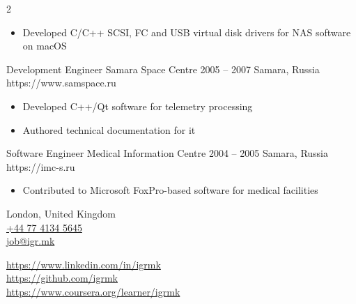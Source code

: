 \documentclass[9pt,a4paper]{igrmkcv}
\begin{document}
\begin{paracol}{2}
        \begin{itemize}
            \item Developed C/C++ SCSI, FC and USB virtual disk drivers for NAS software on macOS
        \end{itemize}

    \cvLeftEvent
        {Development Engineer}
        {Samara Space Centre}
        {2005 -- 2007}
        {Samara, Russia}
        {https://www.samspace.ru}

        \begin{itemize}
            \item Developed C++/Qt software for telemetry processing
            \item Authored technical documentation for it
        \end{itemize}

    \cvLeftEvent
        {Software Engineer}
        {Medical Information Centre}
        {2004 -- 2005}
        {Samara, Russia}
        {https://imc-s.ru}

        \begin{itemize}
            \item Contributed to Microsoft FoxPro-based software for medical facilities
        \end{itemize}

\newpage
\switchcolumn

    London, United Kingdom\\
    \href{tel:+447741345645}{+44 77 4134 5645}\\
    \href{mailto:job@igr.mk}{job@igr.mk}

    \vspace{6pt}
    {
        \small
        \href{https://www.linkedin.com/in/igrmk}{https://www.linkedin.com/in/igrmk}\\
        \href{https://github.com/igrmk}{https://github.com/igrmk}\\
        \href{https://www.coursera.org/learner/igrmk}{https://www.coursera.org/learner/igrmk}
        \par
    }



\end{paracol}
\end{document}
